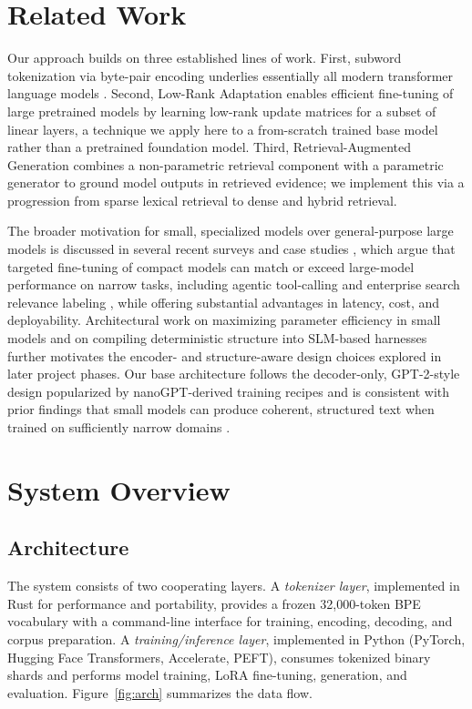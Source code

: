 \documentclass[11pt]{article}
\begin{document}
\section{Related Work}
\label{sec:related}
Our approach builds on three established lines of work. First,
subword tokenization via byte-pair encoding \cite{sennrich2016bpe} underlies
essentially all modern transformer language models
\cite{vaswani2017attention}. Second, Low-Rank Adaptation
\cite{hu2021lora} enables efficient fine-tuning of large pretrained models
by learning low-rank update matrices for a subset of linear layers, a
technique we apply here to a from-scratch trained base model rather than a
pretrained foundation model. Third, Retrieval-Augmented Generation
\cite{lewis2020rag} combines a non-parametric retrieval component with a
parametric generator to ground model outputs in retrieved evidence; we
implement this via a progression from sparse lexical retrieval to dense and
hybrid retrieval.

The broader motivation for small, specialized models over general-purpose
large models is discussed in several recent surveys and case studies
\cite{sharma2025survey,elfeki2025encoder,patience2025ibm,sacai2025edge,linkedin2025ranking,servicenow2025dgx},
which argue that targeted fine-tuning of compact models can match or exceed
large-model performance on narrow tasks, including agentic tool-calling
\cite{jhandi2025slm} and enterprise search relevance labeling
\cite{kang2026enterprise}, while offering substantial advantages in latency,
cost, and deployability. Architectural work on maximizing parameter
efficiency in small models \cite{elfeki2025encoder} and on compiling
deterministic structure into SLM-based harnesses \cite{chong2026harness}
further motivates the encoder- and structure-aware design choices explored
in later project phases. Our base architecture follows the decoder-only,
GPT-2-style design popularized by nanoGPT-derived training recipes
\cite{karpathy2023nanogpt} and is consistent with prior findings that small
models can produce coherent, structured text when trained on sufficiently
narrow domains \cite{eldan2023tinystories}.

\section{System Overview}
\subsection{Architecture}
The system consists of two cooperating layers. A \emph{tokenizer layer},
implemented in Rust for performance and portability, provides a frozen
32{,}000-token BPE vocabulary with a command-line interface for training,
encoding, decoding, and corpus preparation. A \emph{training/inference
layer}, implemented in Python (PyTorch, Hugging Face Transformers,
Accelerate, PEFT), consumes tokenized binary shards and performs model
training, LoRA fine-tuning, generation, and evaluation. Figure~\ref{fig:arch}
summarizes the data flow.
\end{document}

